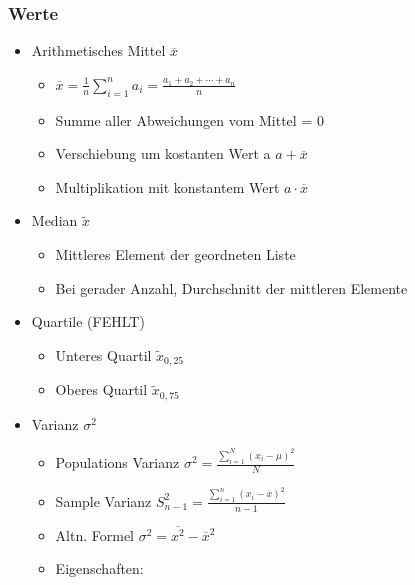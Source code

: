 \documentclass[a4paper]{article}
\begin{document}
\begin{landscape}
\begin{multicols}{4}
    \subsubsection*{Werte}
    \begin{itemize}[noitemsep,nolistsep,leftmargin=*]
        \item Arithmetisches Mittel $\overline{x}$
        \begin{itemize}[noitemsep,nolistsep,leftmargin=*]
            \item $\overline{x}=\frac{1}{n}\sum _{i=1}^{n}a_{i}={\frac {a_{1}+a_{2}+\cdots +a_{n}}{n}}$ 
            \item Summe aller Abweichungen vom Mittel = 0
            \item Verschiebung um kostanten Wert a $a + \overline{x}$
            \item Multiplikation mit konstantem Wert $a \cdot \overline{x}$
        \end{itemize}
        \item Median $\widetilde{x}$
        \begin{itemize}[noitemsep,nolistsep,leftmargin=*]
            \item Mittleres Element der geordneten Liste
            \item Bei gerader Anzahl, Durchschnitt der mittleren Elemente
        \end{itemize}
        \item Quartile (FEHLT)
        \begin{itemize}[noitemsep,nolistsep,leftmargin=*]
            \item Unteres Quartil $\widetilde{x}_{0,25}$
            \item Oberes Quartil $\widetilde{x}_{0,75}$
        \end{itemize}
        \item Varianz $\sigma^2$
        \begin{itemize}[noitemsep,nolistsep,leftmargin=*]
            \item Populations Varianz $\sigma^2 = \frac{\displaystyle\sum_{i=1}^{N}(x_i - \mu)^2} {N}$
            \item Sample Varianz $S^2_{n-1} = \frac{\displaystyle\sum_{i=1}^{n}(x_i - \overline{x})^2} {n-1}$
            \item Altn. Formel $\sigma^2 = \overline{x^2} - \overline{x}^2$
            \item Eigenschaften:
                \begin{itemize}[noitemsep,nolistsep,leftmargin=*]

\end{itemize}
\end{itemize}
\end{itemize}
\end{multicols}
\end{landscape}
\end{document}
